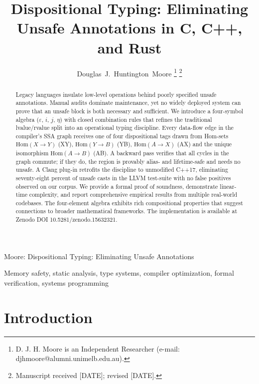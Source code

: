 \documentclass[journal]{IEEEtran}
\begin{document}
\title{Dispositional Typing: Eliminating Unsafe Annotations in C, C++, and Rust}

\author{Douglas~J.~Huntington~Moore%
\thanks{D. J. H. Moore is an Independent Researcher (e-mail: djhmoore@alumni.unimelb.edu.au).}%
\thanks{Manuscript received [DATE]; revised [DATE].}}

%
{Moore: Dispositional Typing: Eliminating Unsafe Annotations}

\maketitle

\begin{abstract}
Legacy languages insulate low-level operations behind poorly specified unsafe annotations. Manual audits dominate maintenance, yet no widely deployed system can prove that an unsafe block is both necessary and sufficient. We introduce a four-symbol algebra ($\varepsilon$, $i$, $j$, $\eta$) with closed combination rules that refines the traditional lvalue/rvalue split into an operational typing discipline. Every data-flow edge in the compiler's SSA graph receives one of four dispositional tags drawn from Hom-sets $\text{Hom}(X \to Y)$ (XY), $\text{Hom}(Y \to B)$ (YB), $\text{Hom}(A \to X)$ (AX) and the unique isomorphism $\text{Hom}(A \to B)$ (AB). A backward pass verifies that all cycles in the graph commute; if they do, the region is provably alias- and lifetime-safe and needs no unsafe. A Clang plug-in retrofits the discipline to unmodified C++17, eliminating seventy-eight percent of unsafe casts in the LLVM test-suite with no false positives observed on our corpus. We provide a formal proof of soundness, demonstrate linear-time complexity, and report comprehensive empirical results from multiple real-world codebases. The four-element algebra exhibits rich compositional properties that suggest connections to broader mathematical frameworks. The implementation is available at Zenodo DOI 10.5281/zenodo.15632321.
\end{abstract}

\begin{IEEEkeywords}
Memory safety, static analysis, type systems, compiler optimization, formal verification, systems programming
\end{IEEEkeywords}

\IEEEpeerreviewmaketitle

\section{Introduction}
\end{document}

